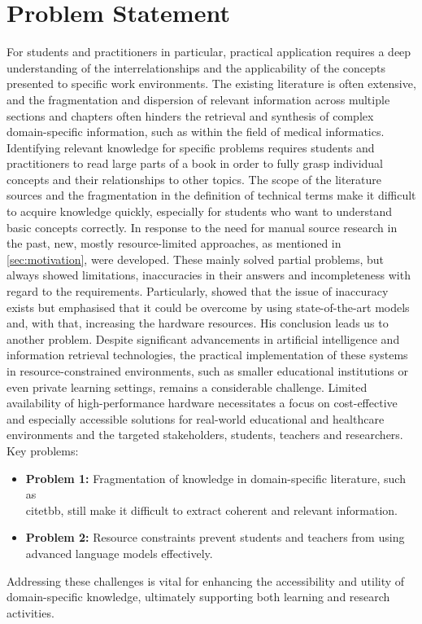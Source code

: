 \section{Problem Statement}\label{sec:problem statement}
For students and practitioners in particular, practical application requires a deep understanding of the interrelationships and the applicability of the concepts presented to specific work environments.
The existing literature is often extensive, and the fragmentation and dispersion of relevant information across multiple sections and chapters often hinders the retrieval and synthesis of complex domain-specific information, such as within the field of medical informatics.
Identifying relevant knowledge for specific problems requires students and practitioners to read large parts of a book in order to fully grasp individual concepts and their relationships to other topics.
The scope of the literature sources and the fragmentation in the definition of technical terms make it difficult to acquire knowledge quickly, especially for students who want to understand basic concepts correctly.
%
In response to the need for manual source research in the past, new, mostly resource-limited approaches, as mentioned in \cref{sec:motivation}, were developed. 
These mainly solved partial problems, but always showed limitations, inaccuracies in their answers and incompleteness with regard to the requirements. 
%
Particularly, \citet{Paul_Keller} showed that the issue of inaccuracy exists but emphasised that it could be overcome by using state-of-the-art models and, with that, increasing the hardware resources. 
His conclusion leads us to another problem.   
Despite significant advancements in artificial intelligence and information retrieval technologies, the practical implementation of these systems in resource-constrained environments, such as smaller educational institutions or even private learning settings, remains a considerable challenge. 
Limited availability of high-performance hardware necessitates a focus on cost-effective and especially accessible solutions for real-world educational and healthcare environments and the targeted stakeholders, students, teachers and researchers.
%
Key problems:
\begin{itemize}
  \item \textbf{Problem 1:} Fragmentation of knowledge in domain-specific literature, such as \\citet{bb}, still make it difficult to extract coherent and relevant information.
  \item \textbf{Problem 2:} Resource constraints prevent students and teachers from using advanced language models effectively.
\end{itemize}
%
Addressing these challenges is vital for enhancing the accessibility and utility of domain-specific knowledge, ultimately supporting both learning and research activities. 

